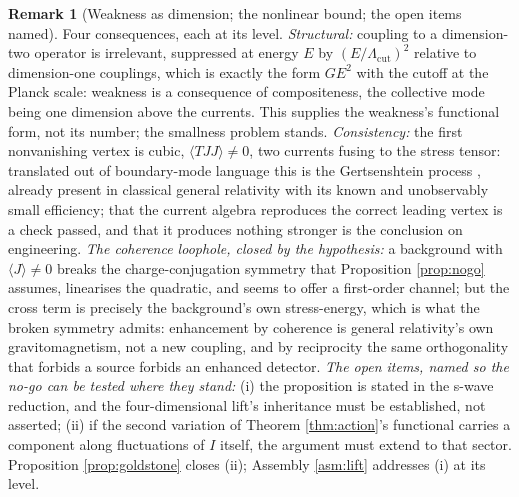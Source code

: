 \documentclass[11pt]{article}
\theoremstyle{definition}
\newtheorem{remark}[theorem]{Remark}
\begin{document}
\begin{remark}[Weakness as dimension; the nonlinear bound; the open items named]\label{rem:weakness}
Four consequences, each at its level. \emph{Structural:} coupling to a dimension-two operator is irrelevant, suppressed at energy $E$ by $(E/\Lambda_{\mathrm{cut}})^2$ relative to dimension-one couplings, which is exactly the form $GE^2$ with the cutoff at the Planck scale: weakness is a consequence of compositeness, the collective mode being one dimension above the currents. This supplies the weakness's functional form, not its number; the smallness problem stands. \emph{Consistency:} the first nonvanishing vertex is cubic, $\langle TJJ\rangle \neq 0$, two currents fusing to the stress tensor: translated out of boundary-mode language this is the Gertsenshtein process \cite{Gertsenshtein1962}, already present in classical general relativity with its known and unobservably small efficiency; that the current algebra reproduces the correct leading vertex is a check passed, and that it produces nothing stronger is the conclusion on engineering. \emph{The coherence loophole, closed by the hypothesis:} a background with $\langle J\rangle \neq 0$ breaks the charge-conjugation symmetry that Proposition \ref{prop:nogo} assumes, linearises the quadratic, and seems to offer a first-order channel; but the cross term is precisely the background's own stress-energy, which is what the broken symmetry admits: enhancement by coherence is general relativity's own gravitomagnetism, not a new coupling, and by reciprocity the same orthogonality that forbids a source forbids an enhanced detector. \emph{The open items, named so the no-go can be tested where they stand:} (i) the proposition is stated in the s-wave reduction, and the four-dimensional lift's inheritance must be established, not asserted; (ii) if the second variation of Theorem \ref{thm:action}'s functional carries a component along fluctuations of $I$ itself, the argument must extend to that sector. Proposition \ref{prop:goldstone} closes (ii); Assembly \ref{asm:lift} addresses (i) at its level.
\end{remark}
\end{document}

